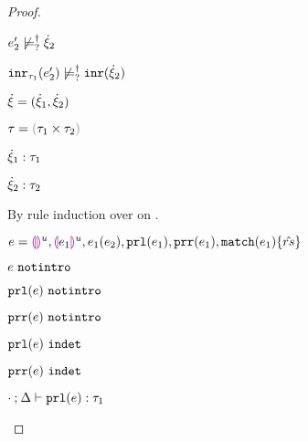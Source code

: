 \begin{proof}
\begin{byCases}
\begin{byCases}
\begin{byCases}
\begin{byCases}
\begin{pfsteps*}
            \item $e_2' \not\models_{?}^{\dag} \dot{\xi}_2$  
            \item $\mathtt{inr}_{\tau_1}({e_2'}) \not\models_{?}^{\dag} \mathtt{inr}(\dot{\xi}_2)$ 
            \end{pfsteps*} 
          \end{byCases}
        \end{byCases}
      \end{byCases} 
    \item[\text{(\ref{rule:CTPair})}]
    \begin{pfsteps*}
    \item $\dot{\xi}=(\dot{\xi}_1 , \dot{\xi}_2)$ 
    \item $\tau=\tprod{\tau_1}{\tau_2}$ 
    \item $\dot{\xi}_1 : \tau_1$  
    \item $\dot{\xi}_2 : \tau_2$  
    \end{pfsteps*} 
    By rule induction over  on .
    \begin{byCases}
      \item[\text{(\ref{rule:IEHole}), (\ref{rule:IHole}), (\ref{rule:IAp}), (\ref{rule:IPrl}), (\ref{rule:IPrr}), (\ref{rule:IMatch})}]
      \begin{pfsteps*}
      \item $e=\textcolor{violet}{\llparenthesis}\textcolor{violet}{\rrparenthesis}^{u}, \textcolor{violet}{\llparenthesis} e_1\textcolor{violet}{\rrparenthesis}^{u}, e_1(e_2), \mathtt{prl}(e_1), \mathtt{prr}(e_1), \mathtt{match}(e_1) \{\hat{rs}\}$ 
      \item $e ~\mathtt{notintro}$  
      \item $\mathtt{prl}(e) ~\mathtt{notintro}$  
      \item $\mathtt{prr}(e) ~\mathtt{notintro}$  
      \item $\mathtt{prl}(e) ~\mathtt{indet}$  
      \item $\mathtt{prr}(e) ~\mathtt{indet}$  
      \item $\cdot \mathbin{;} \Delta \vdash \mathtt{prl}(e) : \tau_1$  

\end{pfsteps*}
\end{byCases}
\end{byCases}
\end{proof}
